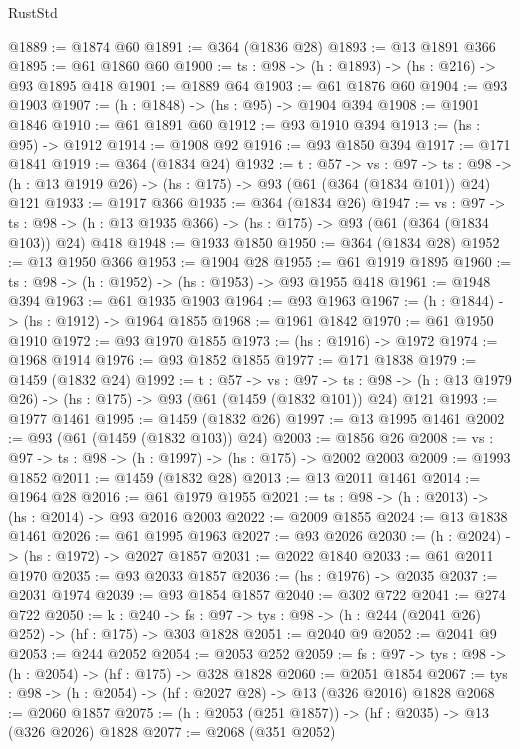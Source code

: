 \begin{lexlean}{RustStd}
\begin{coremodule}
@1889 := @1874 @60
@1891 := @364 (@1836 @28)
@1893 := @13 @1891 @366
@1895 := @61 @1860 @60
@1900 := {ts : @98} -> (h : @1893) -> (hs : @216) -> @93 @1895 @418
@1901 := @1889 @64
@1903 := @61 @1876 @60
@1904 := @93 @1903
@1907 := (h : @1848) -> (hs : @95) -> @1904 @394
@1908 := @1901 @1846
@1910 := @61 @1891 @60
@1912 := @93 @1910 @394
@1913 := (hs : @95) -> @1912
@1914 := @1908 @92
@1916 := @93 @1850 @394
@1917 := @171 @1841
@1919 := @364 (@1834 @24)
@1932 := {t : @57} ->
  {vs : @97} ->
  {ts : @98} -> (h : @13 @1919 @26) -> (hs : @175) -> @93 (@61 (@364 (@1834 @101)) @24) @121
@1933 := @1917 @366
@1935 := @364 (@1834 @26)
@1947 := {vs : @97} ->
  {ts : @98} -> (h : @13 @1935 @366) -> (hs : @175) -> @93 (@61 (@364 (@1834 @103)) @24) @418
@1948 := @1933 @1850
@1950 := @364 (@1834 @28)
@1952 := @13 @1950 @366
@1953 := @1904 @28
@1955 := @61 @1919 @1895
@1960 := {ts : @98} -> (h : @1952) -> (hs : @1953) -> @93 @1955 @418
@1961 := @1948 @394
@1963 := @61 @1935 @1903
@1964 := @93 @1963
@1967 := (h : @1844) -> (hs : @1912) -> @1964 @1855
@1968 := @1961 @1842
@1970 := @61 @1950 @1910
@1972 := @93 @1970 @1855
@1973 := (hs : @1916) -> @1972
@1974 := @1968 @1914
@1976 := @93 @1852 @1855
@1977 := @171 @1838
@1979 := @1459 (@1832 @24)
@1992 := {t : @57} ->
  {vs : @97} ->
  {ts : @98} -> (h : @13 @1979 @26) -> (hs : @175) -> @93 (@61 (@1459 (@1832 @101)) @24) @121
@1993 := @1977 @1461
@1995 := @1459 (@1832 @26)
@1997 := @13 @1995 @1461
@2002 := @93 (@61 (@1459 (@1832 @103)) @24)
@2003 := @1856 @26
@2008 := {vs : @97} -> {ts : @98} -> (h : @1997) -> (hs : @175) -> @2002 @2003
@2009 := @1993 @1852
@2011 := @1459 (@1832 @28)
@2013 := @13 @2011 @1461
@2014 := @1964 @28
@2016 := @61 @1979 @1955
@2021 := {ts : @98} -> (h : @2013) -> (hs : @2014) -> @93 @2016 @2003
@2022 := @2009 @1855
@2024 := @13 @1838 @1461
@2026 := @61 @1995 @1963
@2027 := @93 @2026
@2030 := (h : @2024) -> (hs : @1972) -> @2027 @1857
@2031 := @2022 @1840
@2033 := @61 @2011 @1970
@2035 := @93 @2033 @1857
@2036 := (hs : @1976) -> @2035
@2037 := @2031 @1974
@2039 := @93 @1854 @1857
@2040 := @302 @722
@2041 := @274 @722
@2050 := {k : @240} ->
  {fs : @97} -> {tys : @98} -> (h : @244 (@2041 @26) @252) -> (hf : @175) -> @303 @1828
@2051 := @2040 @9
@2052 := @2041 @9
@2053 := @244 @2052
@2054 := @2053 @252
@2059 := {fs : @97} -> {tys : @98} -> (h : @2054) -> (hf : @175) -> @328 @1828
@2060 := @2051 @1854
@2067 := {tys : @98} -> (h : @2054) -> (hf : @2027 @28) -> @13 (@326 @2016) @1828
@2068 := @2060 @1857
@2075 := (h : @2053 (@251 @1857)) -> (hf : @2035) -> @13 (@326 @2026) @1828
@2077 := @2068 (@351 @2052)

\end{coremodule}
\end{lexlean}
